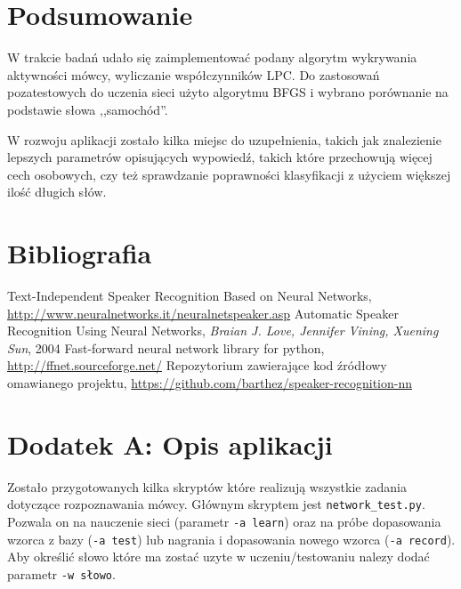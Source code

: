 \documentclass[a4paper]{article}
\begin{document}
\section{Podsumowanie}

W trakcie badań udało się zaimplementować podany algorytm wykrywania aktywności
mówcy, wyliczanie współczynników LPC. Do zastosowań pozatestowych do uczenia
sieci użyto algorytmu BFGS i wybrano porównanie na podstawie słowa ,,samochód''.

W rozwoju aplikacji zostało kilka miejsc do uzupełnienia, takich jak
znalezienie lepszych parametrów opisujących wypowiedź, takich które przechowują
więcej cech osobowych, czy też sprawdzanie poprawności klasyfikacji z użyciem
większej ilość długich słów.

\section{Bibliografia}
\begin{thebibliography}{123}
    Text-Independent Speaker Recognition Based on Neural Networks,
        \url{http://www.neuralnetworks.it/neuralnetspeaker.asp}
    Automatic Speaker Recognition Using Neural Networks, \emph{Braian
        J. Love, Jennifer Vining, Xuening Sun}, 2004
    Fast-forward neural network library for python,
        \url{http://ffnet.sourceforge.net/}
    Repozytorium zawierające kod źródłowy omawianego projektu,
        \url{https://github.com/barthez/speaker-recognition-nn}
\end{thebibliography}

\section{Dodatek A: Opis aplikacji}

Zostało przygotowanych kilka skryptów które realizują wszystkie zadania
dotyczące rozpoznawania mówcy. Głównym skryptem jest \verb|network_test.py|.
Pozwala on na nauczenie sieci (parametr \verb|-a learn|) oraz na próbe
dopasowania wzorca z bazy (\verb|-a test|) lub nagrania i dopasowania nowego
wzorca (\verb|-a record|). Aby określić słowo które ma zostać uzyte w
uczeniu/testowaniu nalezy dodać parametr \verb|-w słowo|.
\end{document}
